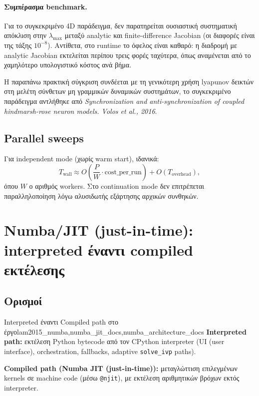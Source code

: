 \documentclass[11pt,a4paper]{report}
\begin{document}
\begin{resultsbox}
\paragraph{Συμπέρασμα benchmark.}
Για το συγκεκριμένο 4D παράδειγμα, δεν παρατηρείται ουσιαστική συστηματική απόκλιση στην
\(\lambda_{\max}\) μεταξύ analytic και finite-difference Jacobian (οι διαφορές είναι της τάξης
\(10^{-8}\)). Αντίθετα, στο runtime το όφελος είναι καθαρό: η διαδρομή με analytic Jacobian
εκτελείται περίπου τρεις φορές ταχύτερα, όπως αναμένεται από το χαμηλότερο υπολογιστικό
κόστος ανά βήμα.

Η παραπάνω πρακτική σύγκριση συνδέεται με τη γενικότερη χρήση lyapunov
δεικτών στη μελέτη σύνθετων μη γραμμικών δυναμικών συστημάτων,
το συγκεκριμένο παράδειγμα αντλήθηκε από \textit{Synchronization and anti-synchronization
of coupled hindmarsh-rose neuron models. Volos et al., 2016}.
\cite{volos2016_hindmarsh_sync}
\end{resultsbox}

\subsection{Parallel sweeps}

Για independent mode (χωρίς warm start), ιδανικά:
\begin{equation}
T_{\mathrm{wall}} \approx O\!\left(\frac{P}{W}\cdot \mathrm{cost\_per\_run}\right)
 + O(T_{\mathrm{overhead}}),
\end{equation}
όπου \(W\) ο αριθμός workers. Στο continuation mode δεν επιτρέπεται
παραλληλοποίηση λόγω αλυσιδωτής εξάρτησης αρχικών συνθηκών.

\section{Numba/JIT (just-in-time): interpreted έναντι compiled εκτέλεσης}
\label{sec:ch2-numba-jit}

\subsection{Ορισμοί}

\begin{toolbox}{Interpreted έναντι Compiled path στο έργο}{lam2015_numba,numba_jit_docs,numba_architecture_docs}
\textbf{Interpreted path:}
εκτέλεση Python bytecode από τον CPython interpreter
(UI (user interface), orchestration, fallbacks, adaptive \texttt{solve\_ivp} paths).

\textbf{Compiled path (Numba JIT (just-in-time)):}
μεταγλώττιση επιλεγμένων kernels σε machine code (μέσω \texttt{@njit}),
με εκτέλεση αριθμητικών βρόχων εκτός interpreter.
\end{toolbox}
\end{document}

